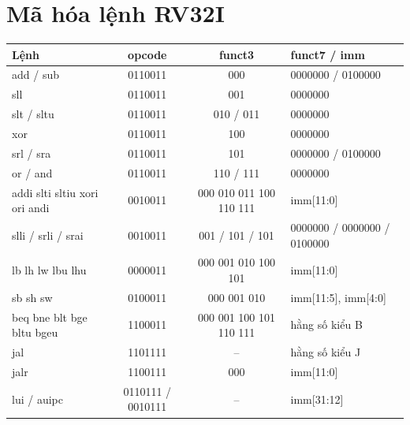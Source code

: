 \documentclass[11pt,a4paper]{article}
\begin{document}
\appendix
\section{Mã hóa lệnh RV32I}
\begin{center}
\small
\begin{tabularx}{\textwidth}{@{}lccX@{}}
\toprule
\textbf{Lệnh} & \textbf{opcode} & \textbf{funct3} & \textbf{funct7 / imm}\\
\midrule
add / sub & 0110011 & 000 & 0000000 / 0100000\\
sll & 0110011 & 001 & 0000000\\
slt / sltu & 0110011 & 010 / 011 & 0000000\\
xor & 0110011 & 100 & 0000000\\
srl / sra & 0110011 & 101 & 0000000 / 0100000\\
or / and & 0110011 & 110 / 111 & 0000000\\
addi slti sltiu xori ori andi & 0010011 & 000 010 011 100 110 111 & imm[11:0]\\
slli / srli / srai & 0010011 & 001 / 101 / 101 & 0000000 / 0000000 / 0100000\\
lb lh lw lbu lhu & 0000011 & 000 001 010 100 101 & imm[11:0]\\
sb sh sw & 0100011 & 000 001 010 & imm[11:5], imm[4:0]\\
beq bne blt bge bltu bgeu & 1100011 & 000 001 100 101 110 111 & hằng số kiểu B\\
jal & 1101111 & -- & hằng số kiểu J\\
jalr & 1100111 & 000 & imm[11:0]\\
lui / auipc & 0110111 / 0010111 & -- & imm[31:12]\\
\bottomrule
\end{tabularx}
\end{center}
\end{document}
